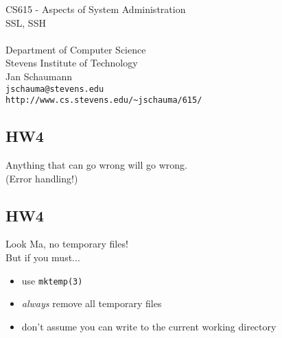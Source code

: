 \documentclass[xga]{xdvislides}
\begin{document}
\setfontphv

\lhead{\slidetitle}                               %
\cfoot{\relax}                               %
\rfoot{\Gray{\today}}

\vspace*{\fill}
\begin{center}
	\Hugesize
		CS615 - Aspects of System Administration\\ [1em]
		SSL, SSH\\ [1em]
	\hspace*{5mm}\blueline\\ [1em]
	\Normalsize
		Department of Computer Science\\
		Stevens Institute of Technology\\
		Jan Schaumann\\
		\verb+jschauma@stevens.edu+\\
		\verb+http://www.cs.stevens.edu/~jschauma/615/+
\end{center}
\vspace*{\fill}

\subsection{HW4}

\vspace*{\fill}
\begin{center}
	\Hugesize
	Anything that can go wrong will go wrong. \\
	\Normalsize
	(Error handling!)
\end{center}
\vspace*{\fill}

\subsection{HW4}
Look Ma, no temporary files!
\\

But if you must...
\begin{itemize}
	\item use {\tt mktemp(3)}
	\item {\em always} remove all temporary files
	\item don't assume you can write to the current working directory
\end{itemize}
\end{document}
